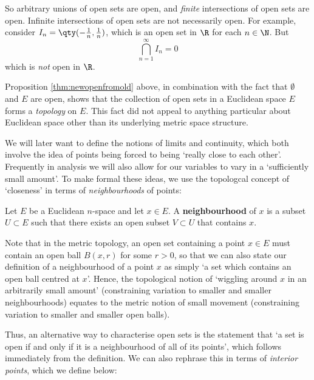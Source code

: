 So arbitrary unions of open sets are open, and \emph{finite} intersections of open sets are open. Infinite intersections of open sets are not necessarily open. For example, consider \( I_n=\qty(-\frac{1}{n},\frac{1}{n}) \), which is an open set in \( \R \) for each \( n\in\N \). But
\[ \bigcap_{n=1}^\infty I_n=\qty{0} \]
which is \emph{not} open in \( \R \).

\vspace{3mm}

Proposition \ref{thm:newopenfromold} above, in combination with the fact that \( \emptyset \) and \( E \) are open, shows that the collection of open sets in a Euclidean space \( E \) forms a \emph{topology} on \( E \). This fact did not appeal to anything particular about Euclidean space other than its underlying metric space structure.

\vspace{3mm}

We will later want to define the notions of limits and continuity, which both involve the idea of points being forced to being `really close to each other'. Frequently in analysis we will also allow for our variables to vary in a `sufficiently small amount'. To make formal these ideas, we use the topologcal concept of `closeness' in terms of \emph{neighbourhoods} of points:

\begin{definition}
  Let \( E \) be a Euclidean \( n \)-space and let \( x\in E \). A \textbf{neighbourhood} of \( x \) is a subset \( U\subset E \) such that there exists an open subset \( V\subset U \) that contains \( x \).
\end{definition}

Note that in the metric topology, an open set containing a point \( x\in E \) must contain an open ball \( B(x,r) \) for some \( r>0 \), so that we can also state our definition of a neighbourhood of a point \( x \) as simply `a set which contains an open ball centred at \( x \)'. Hence, the topological notion of `wiggling around \( x \) in an arbitrarily small amount' (constraining variation to smaller and smaller neighbourhoods) equates to the metric notion of small movement (constraining variation to smaller and smaller open balls).

\vspace{3mm}

Thus, an alternative way to characterise open sets is the statement that `a set is open if and only if it is a neighbourhood of all of its points', which follows immediately from the definition. We can also rephrase this in terms of \emph{interior points}, which we define below:

